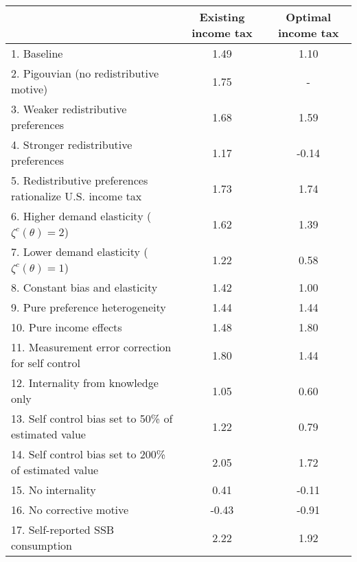 \begin{tabular}{lcc}
\hline
\hline
 & Existing income tax & Optimal income tax \\
\hline
1. Baseline & 1.49 & 1.10 \\
2. Pigouvian (no redistributive motive) & 1.75 & - \\
3. Weaker redistributive preferences & 1.68 & 1.59 \\
4. Stronger redistributive preferences & 1.17 & -0.14 \\
5. Redistributive preferences rationalize U.S. income tax & 1.73 & 1.74 \\
6. Higher demand elasticity ($\zeta^c(\theta) = 2$) & 1.62 & 1.39 \\
7. Lower demand elasticity ($\zeta^c(\theta) = 1$) & 1.22 & 0.58 \\
8. Constant bias and elasticity & 1.42 & 1.00 \\
9. Pure preference heterogeneity & 1.44 & 1.44 \\
10. Pure income effects & 1.48 & 1.80 \\
11. Measurement error correction for self control & 1.80 & 1.44 \\
12. Internality from knowledge only & 1.05 & 0.60 \\
13. Self control bias set to 50\% of estimated value & 1.22 & 0.79 \\
14. Self control bias set to 200\% of estimated value & 2.05 & 1.72 \\
15. No internality & 0.41 & -0.11 \\
16. No corrective motive & -0.43 & -0.91 \\
17. Self-reported SSB consumption & 2.22 & 1.92 \\
\hline
\hline
\end{tabular}
